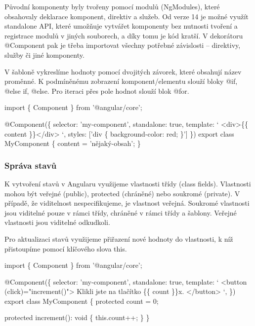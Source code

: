 Původní komponenty byly tvořeny pomocí modulů (NgModules), které obsahovaly deklarace komponent, direktiv a služeb. 
Od verze 14 je možné využít standalone API, které umožňuje vytvářet komponenty bez nutnosti tvoření a registrace modulů v jiných souborech, a díky tomu je kód kratší. 
V dekorátoru @Component pak je třeba importovat všechny potřebné závislosti -- direktivy, služby či jiné komponenty.\cite{angulardev,learningangular}

V šabloně vykreslíme hodnoty pomocí dvojitých závorek, které obsahují název proměnné. K podmíněnému zobrazení komponent/elementu slouží bloky @if, @else if, @else. 
Pro iteraci přes pole hodnot slouží blok @for.\cite{angulardev}

\begin{prog}
import \{ Component \} from '@angular/core';

@Component(\{
  selector: 'my-component',
  standalone: true,
  template: `
    <div>\{\{ content \}\}</div>
  `,
  styles: ['div \{ background-color: red; \}']
\})
export class MyComponent \{
  content = 'nějaký-obsah';
\}
\end{prog}

\subsubsection{Správa stavů}

K vytvoření stavů v Angularu využijeme vlastnosti třídy (class fields). Vlastnosti mohou být veřejné (public), protected (chráněné) nebo soukromé (private). 
V případě, že viditelnost nespecifikujeme, je vlastnost veřejná. Soukromé vlastnosti jsou viditelné pouze v rámci třídy, chráněné v rámci třídy a šablony. 
Veřejné vlastnosti jsou viditelné odkudkoli.\cite{angulardev,learningangular}

Pro aktualizaci stavů využijeme přiřazení nové hodnoty do vlastnosti, k níž přistoupíme pomocí klíčového slova this.\cite{angulardev}

\begin{prog}
import \{ Component \} from '@angular/core';

@Component(\{
  selector: 'my-component',
  standalone: true,
  template: `
    <button (click)="increment()">
      Klikli jste na tlačítko \{\{ count \}\}x.
    </button>
  `,
\})
export class MyComponent \{
  protected count = 0;

  protected increment(): void \{
    this.count++;
  \}
\}
\end{prog}

